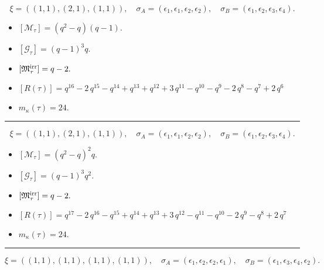 \documentclass[10pt,a4paper]{amsart}
\begin{document}
$$\xi = ({(1, 1)}, {(2, 1), (1, 1)}),\quad \sigma_A = ({{\epsilon_1}}, {{\epsilon_1, \epsilon_2}, {\epsilon_2}}),\quad \sigma_B = ({{\epsilon_1}}, {{\epsilon_2, \epsilon_3}, {\epsilon_4}}).$$

\begin{itemize}
 \item $[\mathcal{M}_{\tau}] = {\left(q^{2} - q\right)} {\left(q - 1\right)} .$

 \item $[\mathcal{G}_{\tau}] = {\left(q - 1\right)}^{3} q .$

 \item $[{\frak M}_{\tau}^{\textrm{irr}}] = q - 2 .$

 \item $[R(\tau)] = q^{16} - 2 \, q^{15} - q^{14} + q^{13} + q^{12} + 3 \, q^{11} - q^{10} - q^{9} - 2 \, q^{8} - q^{7} + 2 \, q^{6} $

 \item $m_{\kappa}(\tau) = 24 .$

 \end{itemize}
\noindent\rule{8cm}{0.4pt}

$$\xi = ({(1, 1)}, {(2, 1)}, {(1, 1)}),\quad \sigma_A = ({{\epsilon_1}}, {{\epsilon_1, \epsilon_2}}, {{\epsilon_2}}),\quad \sigma_B = ({{\epsilon_1}}, {{\epsilon_2, \epsilon_3}}, {{\epsilon_4}}).$$

\begin{itemize}
 \item $[\mathcal{M}_{\tau}] = {\left(q^{2} - q\right)}^{2} q .$

 \item $[\mathcal{G}_{\tau}] = {\left(q - 1\right)}^{3} q^{2} .$

 \item $[{\frak M}_{\tau}^{\textrm{irr}}] = q - 2 .$

 \item $[R(\tau)] = q^{17} - 2 \, q^{16} - q^{15} + q^{14} + q^{13} + 3 \, q^{12} - q^{11} - q^{10} - 2 \, q^{9} - q^{8} + 2 \, q^{7} $

 \item $m_{\kappa}(\tau) = 24 .$

 \end{itemize}
\noindent\rule{8cm}{0.4pt}

$$\xi = ({(1, 1)}, {(1, 1), (1, 1)}, {(1, 1)}),\quad \sigma_A = ({{\epsilon_1}}, {{\epsilon_2}, {\epsilon_2}}, {{\epsilon_1}}),\quad \sigma_B = ({{\epsilon_1}}, {{\epsilon_3}, {\epsilon_4}}, {{\epsilon_2}}).$$
\end{document}
